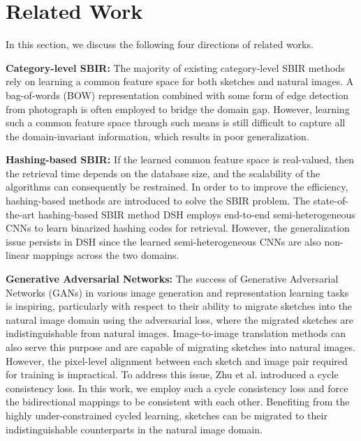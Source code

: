 \section{Related Work}
In this section, we discuss the following four directions of related works. 

\noindent\textbf{Category-level SBIR:} The majority of existing category-level SBIR methods \cite{SaavedraB10,EitzHBA10,LiuSSLS17,SaavedraB15,hu2010,ParuiM14,dalal2005,hu2010_1,Saavedra14,Lowe99,LiHSG14} 
rely on learning a common feature space for both sketches and natural images. A bag-of-words (BOW) representation combined with some form of edge 
detection from photograph is often employed to bridge the domain gap. 
However, learning such a common feature space through such means is still difficult to capture all the domain-invariant information, which results in poor generalization.

\noindent\textbf{Hashing-based SBIR:} If the learned common feature space is real-valued, 
then the retrieval time depends on the database size, 
and the scalability of the algorithms can consequently be restrained. 
In order to to improve the efficiency, 
hashing-based methods \cite{DH15cvpr,liu2014discrete,KSH2012,shen2015supervised,SH08,zhang2016efficient,shen2017tmm,qin2017action,liu2017coding} 
are introduced to solve the SBIR problem. 
The state-of-the-art hashing-based SBIR method DSH \cite{liu2017coding} employs end-to-end semi-heterogeneous CNNs 
to learn binarized hashing codes for retrieval. 
However, the generalization issue persists in DSH since the learned semi-heterogeneous CNNs are also non-linear mappings across the two domains.


\noindent\textbf{Generative Adversarial Networks:} The success of Generative Adversarial Networks (GANs) \cite{goodfellow2014generative} in various 
image generation \cite{denton2015deep,sketchygan} and representation learning \cite{mathieu2016disentangling} tasks is inspiring, 
particularly with respect to their ability to migrate sketches into the natural image domain using the adversarial loss, 
where the migrated sketches are indistinguishable from natural images.  
Image-to-image translation methods \cite{sangkloy2017scribbler,pix2pix2017} can also serve this purpose and are capable of migrating sketches into natural images.
However, the pixel-level alignment between each sketch and image pair required for training is impractical. 
To address this issue,  Zhu et al. \cite{ZhuPIE17} introduced a cycle consistency loss. 
In this work, we employ such a cycle consistency loss and force the bidirectional mappings to be consistent with each other. 
Benefiting from the highly under-constrained cycled learning, 
sketches can be migrated to their indistinguishable counterparts in the natural image domain. 


